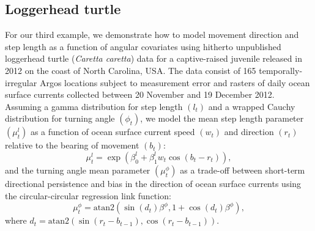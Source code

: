 \documentclass[12pt]{article}\usepackage[]{graphicx}\usepackage[]{xcolor}
\begin{document}
\subsection{Loggerhead turtle}
\label{sec:turtle}
For our third example, we demonstrate how to model movement direction and step length as a function of angular covariates using hitherto unpublished loggerhead turtle ({\it Caretta caretta}) data for a captive-raised juvenile released in 2012 on the coast of North Carolina, USA. The data consist of 165 temporally-irregular Argos locations subject to measurement error and rasters of daily ocean surface currents collected between 20 November and 19 December 2012. Assuming a gamma distribution for step length $(l_t)$ and a wrapped Cauchy distribution for turning angle $(\phi_t)$, we model the mean step length parameter $(\mu^l_t)$ as a function of ocean surface current speed $(w_t)$ and direction $(r_t)$ relative to the bearing of movement $(b_t)$:
\begin{equation}
  \mu^l_t=\exp(\beta^l_0+\beta^l_1 w_t \cos(b_t-r_t)),
  \label{eq:turtleMeanStep}
\end{equation}
and the turning angle mean parameter $(\mu^\phi_t)$ as a trade-off between short-term directional persistence and bias in the direction of ocean surface currents using the circular-circular regression link function:
\begin{equation}
  \mu^\phi_t=\text{atan2}(\sin(d_t) \beta^\phi,1+\cos(d_t)\beta^\phi),
    \label{eq:turtleMeanAngle}
\end{equation}
where $d_t=\text{atan2}(\sin(r_t-b_{t-1}),\cos(r_t-b_{t-1}))$.
\end{document}
